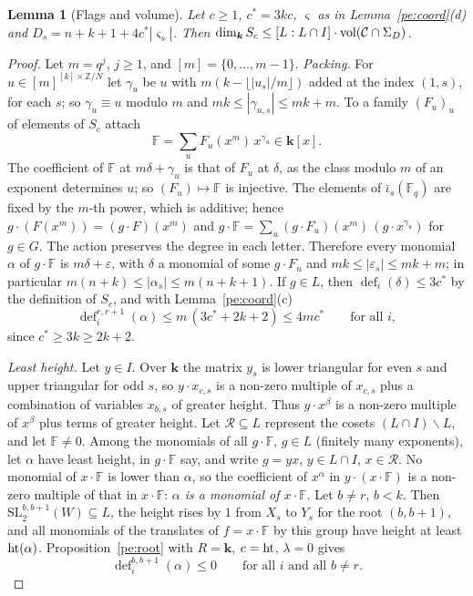 \documentclass[10pt]{amsart}
\newtheorem{lemma}[theorem]{Lemma}
\theoremstyle{definition}
\theoremstyle{remark}
\newcommand{\Z}{\mathbb Z}
\providecommand{\auF}{\mathbb F}
\providecommand{\phdef}{\operatorname{def}}
\providecommand{\phk}{\boldsymbol k}
\begin{document}
\begin{lemma}[Flags and volume]\label{pe:flag}
Let $c\ge1$, $c^*=3kc$, $\varsigma$ as in Lemma~\ref{pe:coord}(d) and $D_s=n+k+1+4c^*|\varsigma_s|$.
Then $\dim_{\phk}S_c\le[L:L\cap I]\cdot\pevol(\peC\cap\Sigma_D)$.
\end{lemma}
\begin{proof}
Let $m=q^j$, $j\ge1$, and $[m]=\{0,\dots,m-1\}$. \emph{Packing.} For $u\in[m]^{[k]\times\Z/N}$ let
$\gamma_u$ be $u$ with $m(k-\lfloor|u_s|/m\rfloor)$ added at the index $(1,s)$, for each $s$; so
$\gamma_u\equiv u$ modulo $m$ and $mk\le|\gamma_{u,s}|\le mk+m$. To a family $(F_u)_u$ of elements
of $S_c$ attach
\[
\mathbb F=\sum_uF_u(x^m)\,x^{\gamma_u}\in\phk[x] .
\]
The coefficient of $\mathbb F$ at $m\delta+\gamma_u$ is that of $F_u$ at $\delta$, as the class
modulo $m$ of an exponent determines $u$; so $(F_u)\mapsto\mathbb F$ is injective. The elements
of $\bar\iota_s(\auF_q)$ are fixed by the $m$-th power, which is additive; hence
$g\cdot(F(x^m))=(g\cdot F)(x^m)$ and $g\cdot\mathbb F=\sum_u(g\cdot F_u)(x^m)\,(g\cdot
x^{\gamma_u})$ for $g\in G$. The action preserves the degree in each letter. Therefore every
monomial $\alpha$ of $g\cdot\mathbb F$ is $m\delta+\varepsilon$, with $\delta$ a monomial of some
$g\cdot F_u$ and $mk\le|\varepsilon_s|\le mk+m$; in particular $m(n+k)\le|\alpha_s|\le m(n+k+1)$.
If $g\in L$, then $\phdef_i(\delta)\le3c^*$ by the definition of $S_c$, and with
Lemma~\ref{pe:coord}(c)
\begin{equation}\label{pe:eq-a}
\phdef_i^{r,r+1}(\alpha)\le m\,(3c^*+2k+2)\le4mc^*\qquad\text{for all }i,
\end{equation}
since $c^*\ge3k\ge2k+2$.

\emph{Least height.} Let $y\in I$. Over $\phk$ the matrix $y_s$ is lower triangular for even $s$
and upper triangular for odd $s$, so $y\cdot x_{c,s}$ is a non-zero multiple of $x_{c,s}$ plus a
combination of variables $x_{b,s}$ of greater height. Thus $y\cdot x^\beta$ is a non-zero multiple
of $x^\beta$ plus terms of greater height. Let $\mathcal R\subseteq L$ represent the cosets
$(L\cap I)\backslash L$, and let $\mathbb F\ne0$. Among the monomials of all $g\cdot\mathbb F$,
$g\in L$ (finitely many exponents), let $\alpha$ have least height, in $g\cdot\mathbb F$ say, and
write $g=yx$, $y\in L\cap I$, $x\in\mathcal R$. No monomial of $x\cdot\mathbb F$ is lower than
$\alpha$, so the coefficient of $x^\alpha$ in $y\cdot(x\cdot\mathbb F)$ is a non-zero multiple of
that in $x\cdot\mathbb F$: \emph{$\alpha$ is a monomial of $x\cdot\mathbb F$}. Let $b\ne r$, $b<k$.
Then $\mathrm{SL}_2^{b,b+1}(W)\subseteq L$, the height rises by $1$ from $X_s$ to $Y_s$ for the
root $(b,b+1)$, and all monomials of the translates of $f=x\cdot\mathbb F$ by this group have
height at least $\operatorname{ht}(\alpha)$. Proposition~\ref{pe:root} with $R=\phk$, $c=\operatorname{ht}$, $\lambda=0$
gives
\begin{equation}\label{pe:eq-b}
\phdef_i^{b,b+1}(\alpha)\le0\qquad\text{for all }i\text{ and all }b\ne r .
\end{equation}


\end{proof}
\end{document}
